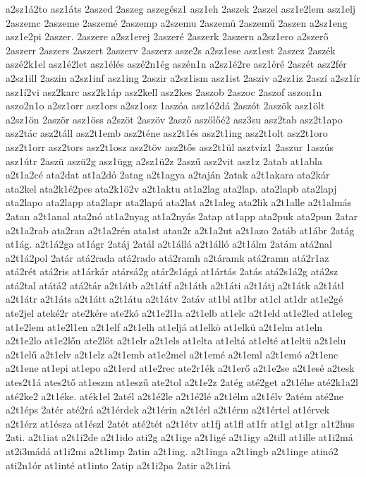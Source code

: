 {a2sz1á2to
asz1áts
2aszed
2aszeg
aszegész1
asz1eh
2aszek
2aszel
asz1e2lem
asz1elj
2aszemc
2aszeme
2aszemé
2aszemp
a2szemu
2aszemü
2aszemű
2aszen
a2sz1eng
asz1e2pi
2aszer.
2aszere
a2sz1erej
2aszeré
2aszerk
2aszern
a2sz1ero
a2szerő
2aszerr
2aszers
2aszert
2aszerv
2aszerz
asze2s
a2sz1ese
asz1est
2aszez
2aszék
aszé2k1el
asz1é2let
asz1élés
aszé2n1ég
aszén1n
a2sz1é2re
asz1éré
2aszét
asz2fér
a2sz1ill
2aszin
a2sz1inf
asz1ing
2aszir
a2sz1ism
asz1ist
2asziv
a2sz1iz
2aszí
a2sz1ír
asz1í2vi
asz2karc
asz2k1áp
asz2kell
asz2kes
2aszob
2aszoc
2aszof
aszon1n
aszo2n1o
a2sz1orr
asz1ors
a2sz1osz
1aszóa
asz1ó2dá
2aszót
2aszök
asz1ölt
a2sz1ön
2aször
asz1öss
a2szöt
2aszöv
2asző
aszőlőé2
asz3su
asz2tab
asz2t1apo
asz2tác
asz2táll
asz2t1emb
asz2téne
asz2t1és
asz2t1ing
asz2t1olt
asz2t1oro
asz2t1orr
asz2tors
asz2t1osz
asz2töv
asz2tős
asz2t1ül
asztvíz1
2aszur
1aszús
asz1útr
2aszü
aszü2g
asz1ügg
a2sz1ü2z
2aszű
asz2vit
asz1z
2atab
at1abla
a2t1a2cé
ata2dat
at1a2dó
2atag
a2t1agya
a2taján
2atak
a2t1akara
ata2kár
ata2kel
ata2k1é2pes
ata2k1ö2v
a2t1aktu
at1a2lag
ata2lap.
ata2lapb
ata2lapj
ata2lapo
ata2lapp
ata2lapr
ata2lapú
ata2lat
a2t1aleg
ata2lik
a2t1alle
a2t1almás
2atan
a2t1anal
ata2nó
at1a2nyag
at1a2nyás
2atap
at1app
ata2puk
ata2pun
2atar
a2t1a2rab
ata2ran
a2t1a2rén
ata1st
atau2r
a2t1a2ut
a2t1azo
2atáb
at1ábr
2atág
at1ág.
a2t1á2ga
at1ágr
2atáj
2atál
a2t1állá
a2t1álló
a2t1álm
2atám
atá2nal
a2t1á2pol
2atár
atá2rada
atá2rado
atá2ramh
a2táramk
atá2ramn
atá2r1az
atá2rét
atá2ris
at1árkár
atársá2g
atár2s1ágá
at1ártás
2atás
atá2s1á2g
atá2sz
atá2tal
atátá2
atá2tár
a2t1átb
a2t1átf
a2t1áth
a2t1áti
a2t1átj
a2t1átk
a2t1átl
a2t1átr
a2t1áts
a2t1átt
a2t1átu
a2t1átv
2atáv
at1bl
at1br
at1cl
at1dr
at1e2gé
ate2jel
ateké2r
ate2kére
ate2kó
a2t1e2l1a
a2t1elb
at1elc
a2t1eld
at1e2led
at1eleg
at1e2lem
at1e2l1en
a2t1elf
a2t1elh
at1eljá
at1elkö
at1elkü
a2t1elm
at1eln
a2t1e2lo
at1e2lőn
ate2lőt
a2t1elr
a2t1els
at1elta
at1eltá
at1elté
at1eltü
a2t1elu
a2t1elű
a2t1elv
a2t1elz
a2t1emb
at1e2mel
a2t1emé
a2t1eml
a2t1emó
a2t1enc
a2t1ene
at1epi
at1epo
a2t1erd
at1e2rec
ate2r1ék
a2t1erő
a2t1e2se
a2t1esé
a2tesk
ates2t1á
ates2tő
at1eszm
at1eszű
ate2tol
a2t1e2z
2atég
até2get
a2t1éhe
até2k1a2l
até2ke2
a2t1éke.
aték1el
2atél
a2t1é2le
a2t1é2lé
a2t1élm
a2t1élv
2atém
até2ne
a2t1éps
2atér
até2rá
a2t1érdek
a2t1érin
a2t1érl
a2t1érm
a2t1értel
at1érvek
a2t1érz
at1észa
at1észl
2atét
até2tét
a2t1étv
at1fj
at1fl
at1fr
at1gl
at1gr
a1t2hus
2ati.
a2t1iat
a2t1i2de
a2t1ido
ati2g
a2t1ige
a2t1igé
a2t1igy
a2till
at1ille
at1i2má
at2i3mádá
at1i2mi
a2t1imp
2atin
a2t1ing.
a2t1inga
a2t1ingb
a2t1inge
atinó2
ati2n1ór
at1inté
at1into
2atip
a2t1i2pa
2atir
a2t1irá
}
